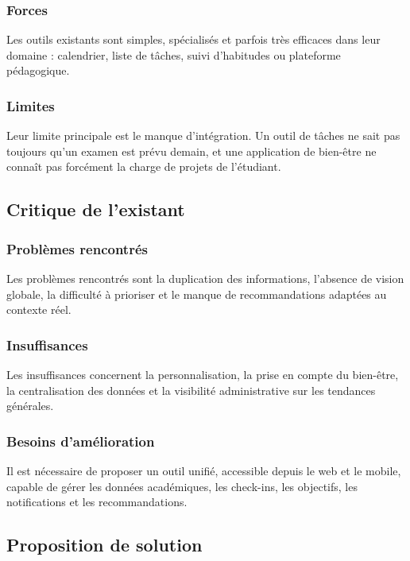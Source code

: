 \documentclass{rapportENSET}
\begin{document}
\subsubsection*{Forces}
Les outils existants sont simples, spécialisés et parfois très efficaces dans leur domaine : calendrier, liste de tâches, suivi d'habitudes ou plateforme pédagogique.

\subsubsection*{Limites}
Leur limite principale est le manque d'intégration. Un outil de tâches ne sait pas toujours qu'un examen est prévu demain, et une application de bien-être ne connaît pas forcément la charge de projets de l'étudiant.

\subsection{Critique de l'existant}
\subsubsection*{Problèmes rencontrés}
Les problèmes rencontrés sont la duplication des informations, l'absence de vision globale, la difficulté à prioriser et le manque de recommandations adaptées au contexte réel.

\subsubsection*{Insuffisances}
Les insuffisances concernent la personnalisation, la prise en compte du bien-être, la centralisation des données et la visibilité administrative sur les tendances générales.

\subsubsection*{Besoins d'amélioration}
Il est nécessaire de proposer un outil unifié, accessible depuis le web et le mobile, capable de gérer les données académiques, les check-ins, les objectifs, les notifications et les recommandations.

\subsection{Proposition de solution}
\end{document}
